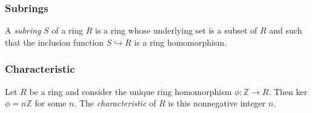\subsubsection{Subrings}\label{subrings}
A \emph{subring} $S$ of a ring $R$ is a ring whose underlying set is a subset of $R$ and such that
the inclusion function $S \hookrightarrow R$ is a ring homomorphism.

\subsubsection{Characteristic}\label{characteristic}
Let $R$ be a ring and consider the unique ring homomorphism $\phi: \mathbb{Z} \rightarrow R$. Then ker$\phi = n\mathbb{Z}$
for some $n$. The \emph{characteristic} of $R$ is this nonnegative integer $n$.
